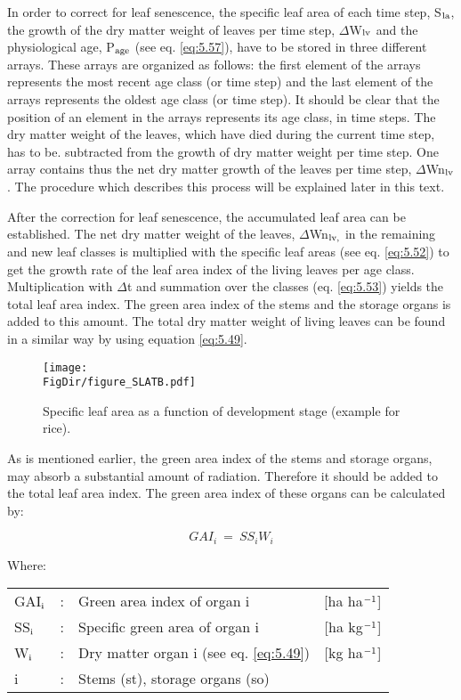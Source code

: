 In order to correct for leaf senescence, the specific leaf area of each time step, S$_{{\rm la}}$, the
growth of the dry matter weight of leaves per time step, $\Delta$W$_{{\rm lv}}$ and the physiological age,
P$_{{\rm age}}$ (see eq. \ref{eq:5.57}), have to be stored in three different arrays. These arrays are organized
as follows: the first element of the arrays represents the most recent age class (or time
step) and the last element of the arrays represents the oldest age class (or time step). It
should be clear that the position of an element in the arrays represents its age class, in
time steps. The dry matter weight of the leaves, which have died during the current time
step, has to be. subtracted from the growth of dry matter weight per time step. One array
contains thus the net dry matter growth of the leaves per time step, $\Delta$Wn$_{{\rm lv}}$. 
The procedure which describes this process will be explained later in this text. 

After the correction for leaf senescence, the accumulated leaf area can be established. The
net dry matter weight of the leaves, $\Delta$Wn$_{{\rm lv,}}$  in the remaining and new leaf classes is
multiplied with the specific leaf areas (see eq. \ref{eq:5.52}) to get the growth rate of the leaf area
index of the living leaves per age class. Multiplication with $\Delta$t and summation over the
classes (eq. \ref{eq:5.53}) yields the total leaf area index. The green area index of the stems and
the storage organs is added to this amount. The total dry matter weight of living leaves
can be found in a similar way by using equation \ref{eq:5.49}.

\begin{figure}[p]
	\centering
	\texttt{[image: \\FigDir/figure\_SLATB.pdf]}
	\caption{Specific leaf area as a function of development stage (example for rice).}
	\label{fig:SpecificLeafArea}
\end{figure}

As is mentioned earlier, the green area index of the stems and storage organs, may absorb
a substantial amount of radiation. Therefore it should be added to the total leaf area
index. The green area index of these organs can be calculated by:

\begin{equation}
GAI_{i} ~=~SS _{i} W _{i} 
\end{equation}

Where:\\[5pt]
\begin{tabularx}{\textwidth}{llXr}
	GAI$_{{\rm i}}$ &:& Green area index of organ i    &
	[ha ha$^{{\rm -1}}$]\\
	SS$_{{\rm i}}$ &:& Specific green area of organ i    &
	[ha kg$^{{\rm -1}}$]\\
	W$_{{\rm i}}$ &:& Dry matter organ i (see eq. \ref{eq:5.49})    &
	[kg ha$^{{\rm -1}}$]\\
	i &:& Stems (st), storage organs (so)
\end{tabularx}

